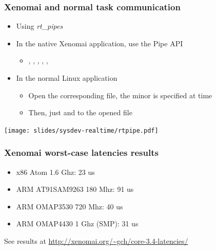 \begin{frame}
  \frametitle{Xenomai and normal task communication}
  \begin{itemize}
  \item Using {\em rt\_pipes}
  \item In the native Xenomai application, use the Pipe API
    \begin{itemize}
    \item {}, ,
      , ,
      , 
    \end{itemize}
  \item In the normal Linux application
    \begin{itemize}
    \item Open the corresponding  file, the minor is specified at
       time
    \item Then, just  and  to the opened file
    \end{itemize}
  \end{itemize}
  \begin{center}
    \texttt{[image: slides/sysdev-realtime/rtpipe.pdf]}
  \end{center}
\end{frame}

\begin{frame}
  \frametitle{Xenomai worst-case latencies results}
  \begin{itemize}
  \item x86 Atom 1.6 Ghz: 23 us
  \item ARM AT91SAM9263 180 Mhz: 91 us
  \item ARM OMAP3530 720 Mhz: 40 us
  \item ARM OMAP4430 1 Ghz (SMP): 31 us
  \end{itemize}
  See results at \url{http://xenomai.org/~gch/core-3.4-latencies/}
\end{frame}

